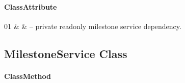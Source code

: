 \paragraph{ClassAttribute}
\begin{ClassAttributeTable}
01 &  &  -- private readonly milestone service dependency. \\ \hline
\end{ClassAttributeTable}

\subsection{MilestoneService Class}

\paragraph{ClassMethod}
